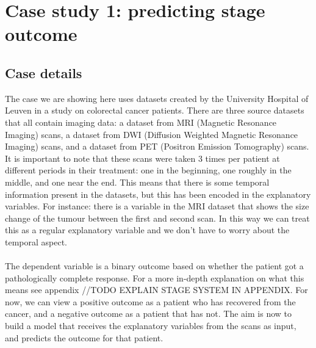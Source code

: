 \section{Case study 1: predicting stage outcome}
\label{sec:evaluation-predictingstage}
\subsection{Case details}
\label{sec:evaluation-casedetails}
The case we are showing here uses datasets created by the University Hospital of Leuven in a study on colorectal cancer patients. There are three source datasets that all contain imaging data: a dataset from MRI (Magnetic Resonance Imaging) scans, a dataset from DWI (Diffusion Weighted Magnetic Resonance Imaging) scans, and a dataset from PET (Positron Emission Tomography) scans. It is important to note that these scans were taken 3 times per patient at different periods in their treatment: one in the beginning, one roughly in the middle, and one near the end. This means that there is some temporal information present in the datasets, but this has been encoded in the explanatory variables. For instance: there is a variable in the MRI dataset that shows the size change of the tumour between the first and second scan. In this way we can treat this as a regular explanatory variable and we don't have to worry about the temporal aspect. \\ \\
The dependent variable is a binary outcome based on whether the patient got a pathologically complete response. For a more in-depth explanation on what this means see appendix //TODO EXPLAIN STAGE SYSTEM IN APPENDIX. For now, we can view a positive outcome as a patient who has recovered from the cancer, and a negative outcome as a patient that has not. The aim is now to build a model that receives the explanatory variables from the scans as input, and predicts the outcome for that patient.
